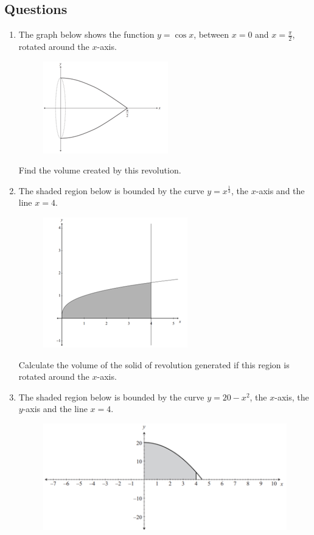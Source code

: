 \documentclass[../main.tex]{subfiles}
\begin{document}
\subsection*{Questions}
\label{Volumes of revolution}
\begin{enumerate}[itemsep=0.7cm]
    \item 
    The graph below shows the function $y=\cos{x}$, between $x=0$ and $x=\frac{\pi}{2}$, rotated around the $x$-axis.
    \begin{figure}[h]
        \centering
        \includegraphics{images/volrev8.png}
    \end{figure}
    Find the volume created by this revolution.

    \item 
    The shaded region below is bounded by the curve $y=x^{\frac{1}{3}}$, the $x$-axis and the line $x=4$.
    \begin{figure}[h]
        \centering
        \includegraphics[width=0.3\linewidth]{images/volrev9.png}
    \end{figure}

    Calculate the volume of the solid of revolution generated if this region is rotated around the $x$-axis.

    \item
    The shaded region below is bounded by the curve $y=20-x^2$, the $x$-axis, the $y$-axis and the line $x=4$.
    \begin{figure}[h]
        \centering
        \includegraphics{images/volrev11.png}
    \end{figure}


\end{enumerate}
\end{document}
